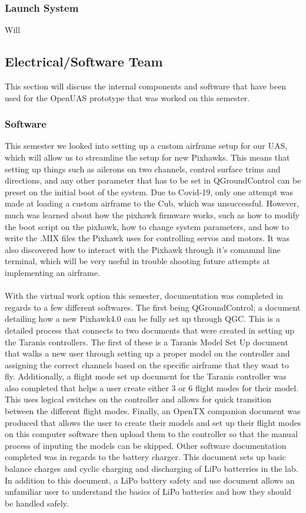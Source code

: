 \documentclass{article}
\begin{document}
\subsubsection{Launch System}
Will


\subsection{Electrical/Software Team}
This section will discuss the internal components and software that have been used for the OpenUAS prototype that was worked on this semester.

\subsubsection{Software}
This semester we looked into setting up a custom airframe setup for our UAS, which will allow us to streamline the setup for new Pixhawks. This means that setting up things such as ailerons on two channels, control surface trims and directions, and any other parameter that has to be set in QGroundControl can be preset on the initial boot of the system. Due to Covid-19, only one attempt was made at loading a custom airframe to the Cub, which was unsuccessful. However, much was learned about how the pixhawk firmware works, such as how to modify the boot script on the pixhawk, how to change system parameters, and how to write the .MIX files the Pixhawk uses for controlling servos and motors. It was also discovered how to interact with the Pixhawk through it's comamnd line terminal, which will be very useful in trouble shooting future attempts at implementing an airframe.\\ \\

With the virtual work option this semester, documentation was completed in regards to a few different softwares. The first being QGroundControl; a document detailing how a new Pixhawk4.0 can be fully set up through QGC. This is a detailed process that connects to two documents that were created in setting up the Taranis controllers. The first of these is a Taranis Model Set Up document that walks a new user through setting up a proper model on the controller and assigning the correct channels based on the specific airframe that they want to fly. Additionally, a flight mode set up document for the Taranis controller was also completed that helps a user create either 3 or 6 flight modes for their model. This uses logical switches on the controller and allows for quick transition between the different flight modes. Finally, an OpenTX companion document was produced that allows the user to create their models and set up their flight modes on this computer software then upload them to the controller so that the manual process of inputing the models can be skipped. Other software documentation completed was in regards to the battery charger. This document sets up basic balance charges and cyclic charging and discharging of LiPo batterries in the lab. In addition to this document, a LiPo battery safety and use document allows an unfamiliar user to understand the basics of LiPo batteries and how they should be handled safely. \\ \\
\end{document}
